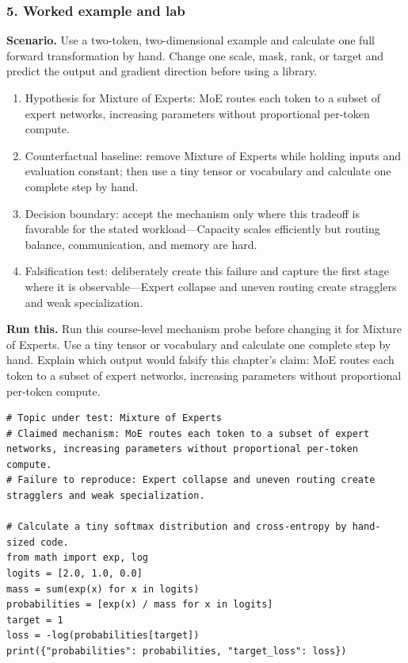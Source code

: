 \subsubsection*{5. Worked example and lab}
\textbf{Scenario.} Use a two-token, two-dimensional example and calculate one full forward transformation by hand. Change one scale, mask, rank, or target and predict the output and gradient direction before using a library.
\begin{enumerate}
\item Hypothesis for Mixture of Experts: MoE routes each token to a subset of expert networks, increasing parameters without proportional per-token compute.
\item Counterfactual baseline: remove Mixture of Experts while holding inputs and evaluation constant; then use a tiny tensor or vocabulary and calculate one complete step by hand.
\item Decision boundary: accept the mechanism only where this tradeoff is favorable for the stated workload—Capacity scales efficiently but routing balance, communication, and memory are hard.
\item Falsification test: deliberately create this failure and capture the first stage where it is observable—Expert collapse and uneven routing create stragglers and weak specialization.
\end{enumerate}
\textbf{Run this.} Run this course-level mechanism probe before changing it for Mixture of Experts. Use a tiny tensor or vocabulary and calculate one complete step by hand. Explain which output would falsify this chapter's claim: MoE routes each token to a subset of expert networks, increasing parameters without proportional per-token compute.
\begin{Verbatim}[fontsize=\scriptsize]
# Topic under test: Mixture of Experts
# Claimed mechanism: MoE routes each token to a subset of expert networks, increasing parameters without proportional per-token compute.
# Failure to reproduce: Expert collapse and uneven routing create stragglers and weak specialization.

# Calculate a tiny softmax distribution and cross-entropy by hand-sized code.
from math import exp, log
logits = [2.0, 1.0, 0.0]
mass = sum(exp(x) for x in logits)
probabilities = [exp(x) / mass for x in logits]
target = 1
loss = -log(probabilities[target])
print({"probabilities": probabilities, "target_loss": loss})
\end{Verbatim}
